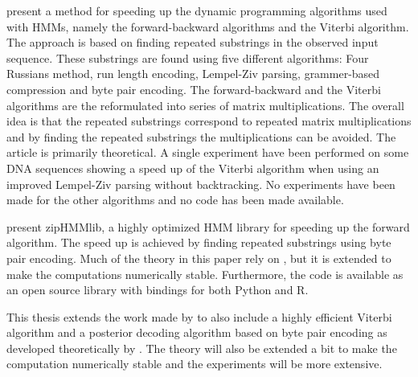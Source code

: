 \citet{lifshits2009speeding} present a method for speeding up the dynamic
programming algorithms used with HMMs, namely the forward-backward algorithms
and the Viterbi algorithm. The approach is based on finding repeated substrings
in the observed input sequence. These substrings are found using five different
algorithms: Four Russians method, run length encoding, Lempel-Ziv parsing,
grammer-based compression and byte pair encoding. The forward-backward and the
Viterbi algorithms are the reformulated into series of matrix
multiplications. The overall idea is that the repeated substrings correspond to
repeated matrix multiplications and by finding the repeated substrings the
multiplications can be avoided. The article is primarily theoretical. A single
experiment have been performed on some DNA sequences showing a speed up of the
Viterbi algorithm when using an improved Lempel-Ziv parsing without
backtracking. No experiments have been made for the other algorithms and no
code has been made available.

\citet{sand2013ziphmmlib} present zipHMMlib, a highly optimized HMM library for
speeding up the forward algorithm. The speed up is achieved by finding repeated
substrings using byte pair encoding. Much of the theory in this paper rely on
\cite{lifshits2009speeding}, but it is extended to make the computations
numerically stable. Furthermore, the code is available as an open source
library with bindings for both Python and R.

This thesis extends the work made by \citet{sand2013ziphmmlib} to also include
a highly efficient Viterbi algorithm and a posterior decoding algorithm based
on byte pair encoding as developed theoretically by
\citet{lifshits2009speeding}. The theory will also be extended a bit to make
the computation numerically stable and the experiments will be more extensive.

